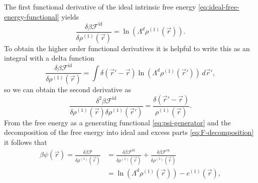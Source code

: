 The first functional derivative of the ideal intrinsic free energy \eqref{eq:ideal-free-energy-functional} yields
\begin{equation*}
  \frac{
    \delta \beta \mathcal{F}^\mathrm{id}
  }{
    \delta \rho^{(1)}(\vec{r})
  }
  =
  \ln{(\Lambda^d \rho^{(1)}(\vec{r}))}.
\end{equation*}
To obtain the higher order functional derivatives it is helpful to write this as an integral with a delta function
\begin{equation*}
  \frac{
    \delta \beta \mathcal{F}^\mathrm{id}
  }{
    \delta \rho^{(1)}(\vec{r})
  }
  =
  \int \delta{(\vec{r}' - \vec{r})}
  \ln{(\Lambda^d \rho^{(1)}(\vec{r}'))} \, d\vec{r}',
\end{equation*}
so we can obtain the second derivative as
\begin{equation*}
  \frac{
    \delta^2 \beta \mathcal{F}^\mathrm{id}
  }{
    \delta \rho^{(1)}(\vec{r}) \delta \rho^{(1)}(\vec{r}')
  }
  =
  \frac{\delta(\vec{r}'-\vec{r})}{\rho^{(1)}(\vec{r})}.
\end{equation*}
From the free energy as a generating functional \eqref{eq:psi-generator} and the decomposition of the free energy into ideal and excess parts \eqref{eq:F-decomposition} it follows that
\begin{equation*}
  \begin{split}
    \beta \psi(\vec{r})
    =
    \frac{\delta \beta \mathcal{F}}{\delta \rho^{(1)}(\vec{r})}
    &=
    \frac{\delta \beta \mathcal{F}^\mathrm{id}}{\delta \rho^{(1)}(\vec{r})}
    + \frac{\delta \beta \mathcal{F}^\mathrm{ex}}{\delta \rho^{(1)}(\vec{r})}
    \\
    &=
    \ln{(\Lambda^d \rho^{(1)}(\vec{r}))} - c^{(1)}(\vec{r}),
  \end{split}
\end{equation*}
